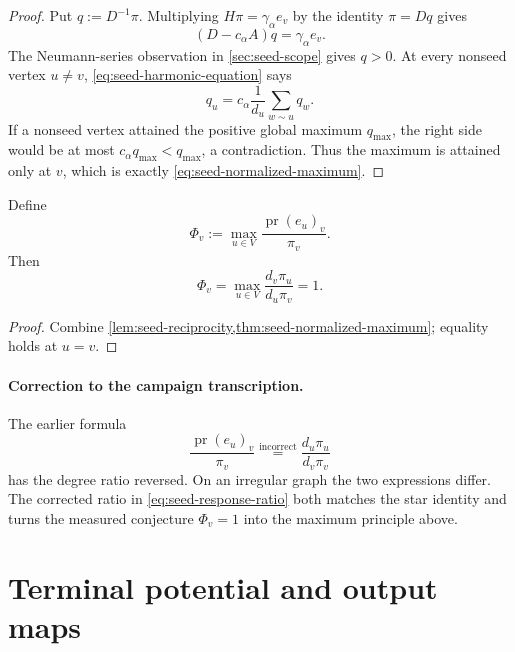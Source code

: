 \documentclass[11pt]{article}
\begin{document}
\begin{proof}
Put $q:=D^{-1}\pi$.  Multiplying $H\pi=\gamma_{\alpha} e_v$ by the identity
$\pi=Dq$ gives
\begin{equation}
 (D-c_{\alpha} A)q=\gamma_{\alpha} e_v.
 \label{eq:seed-harmonic-equation}
\end{equation}
The Neumann-series observation in \cref{sec:seed-scope} gives $q>0$.  At
every nonseed vertex $u\ne v$, \eqref{eq:seed-harmonic-equation} says
\begin{equation}
 q_u=c_{\alpha}\frac{1}{d_u}\sum_{w\sim u}q_w.
 \label{eq:seed-strict-subharmonic}
\end{equation}
If a nonseed vertex attained the positive global maximum $q_{\max}$, the
right side would be at most $c_{\alpha} q_{\max}<q_{\max}$, a contradiction.
Thus the maximum is attained only at $v$, which is exactly
\eqref{eq:seed-normalized-maximum}.
\end{proof}

\begin{corollary}
\label{cor:seed-response-row}
Define
\begin{equation}
 \Phi_v:=\max_{u\in V}\frac{\operatorname{pr}(e_u)_v}{\pi_v}.
 \label{eq:seed-phi-definition}
\end{equation}
Then
\begin{equation}
 \Phi_v
 =\max_{u\in V}\frac{d_v\pi_u}{d_u\pi_v}
 =1.
 \label{eq:seed-phi-one}
\end{equation}
\end{corollary}

\begin{proof}
Combine \cref{lem:seed-reciprocity,thm:seed-normalized-maximum}; equality
holds at $u=v$.
\end{proof}

\paragraph{Correction to the campaign transcription.}
The earlier formula
\[
 \frac{\operatorname{pr}(e_u)_v}{\pi_v}
 \stackrel{\mathrm{incorrect}}{=}
 \frac{d_u\pi_u}{d_v\pi_v}
\]
has the degree ratio reversed.  On an irregular graph the two expressions
differ.  The corrected ratio in \eqref{eq:seed-response-ratio} both matches
the star identity and turns the measured conjecture $\Phi_v=1$ into the
maximum principle above.

\section{Terminal potential and output maps}
\label{sec:seed-output-map}
\end{document}
